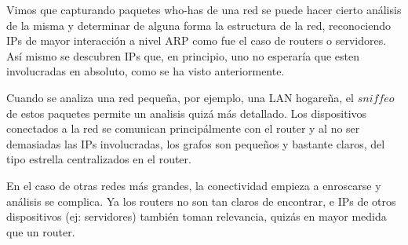 Vimos que capturando paquetes who-has de una red se puede hacer cierto análisis
de la misma y determinar de alguna forma la estructura de la red, reconociendo
IPs de mayor interacción a nivel ARP como fue el caso de routers o servidores.
Así mismo se descubren IPs que, en principio, uno no esperaría que esten involucradas
en absoluto, como se ha visto anteriormente.

Cuando se analiza una red pequeña, por ejemplo, una LAN hogareña, el $sniffeo$
de estos paquetes permite un analisis quizá más detallado. Los dispositivos 
conectados a la red se comunican principálmente con el router y al no ser 
demasiadas las IPs involucradas, los grafos son pequeños y bastante claros, del
tipo estrella centralizados en el router.

En el caso de otras redes más grandes, la conectividad empieza a enroscarse y 
análisis se complica. Ya los routers no son tan claros de encontrar, e IPs de 
otros dispositivos (ej: servidores) también toman relevancia, quizás en mayor medida
que un router. 

